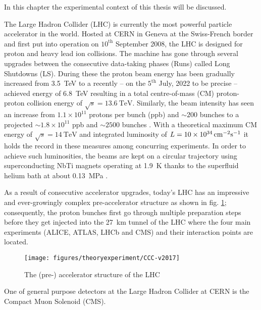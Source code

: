 
In this chapter the experimental context of this thesis will be discussed. 

\label{sec:theory}

The Large Hadron Collider (LHC) is currently the most powerful particle accelerator in the world. Hosted at CERN in Geneva at the Swiss-French border and first put into operation on $\text{10}^\text{th}$ September 2008, the LHC is designed for proton and heavy lead ion collisions. The machine has gone through several upgrades between the consecutive data-taking phases (Runs) called Long Shutdowns (LS). During these the proton beam energy has been gradually increased from \SI{3.5}{\tera\electronvolt} to a recently -- on the $\text{5}^{\text{th}}$ July, 2022 to be precise -- achieved energy of \SI{6.8}{\tera\electronvolt} \cite{Alici:2773265} resulting in a total centre-of-mass (CM) proton-proton collision energy of $\sqrt{s} = \SI{13.6}{\tera\electronvolt}$. Similarly, the beam intensity has seen an increase from $1.1 \times 10^{11}$ protons per bunch (ppb) and $\sim 200$ bunches to a projected $\sim 1.8 \times 10^{11}$ ppb and $\sim 2500$ bunches \cite{Fartoukh:2790409, Karastathis:2750302}. With a theoretical maximum CM energy of $\sqrt{s} = \SI{14}{\tera\electronvolt}$ and integrated luminosity of $L = \SI{10d34}{\centi\meter^{-2}\second^{-1}}$ it holds the record in these measures among concurring experiments. In order to achieve such luminosities, the beams are kept on a circular trajectory using superconducting NbTi magnets operating at \SI{1.9}{\kelvin} thanks to the superfluid helium bath at about \SI{0.13}{\mega\pascal} \cite{Brüning:782076}.

As a result of consecutive accelerator upgrades, today's LHC has an impressive and ever-growingly complex pre-accelerator structure as shown in fig. \ref{fig:lhcstructure}; consequently, the proton bunches first go through multiple preparation steps before they get injected into the \SI{27}{\kilo\meter} tunnel of the LHC where the four main experiments (ALICE, ATLAS, LHCb and CMS) and their interaction points are located. 

\begin{figure}[h!]
	\centering
	\texttt{[image: figures/theoryexperiment/CCC-v2017]}
	\caption{The (pre-) accelerator structure of the LHC \cite{Mobs:2197559}}
	\label{fig:lhcstructure}
\end{figure}



One of general purpose detectors at the Large Hadron Collider at CERN is the Compact Muon Solenoid (CMS).
